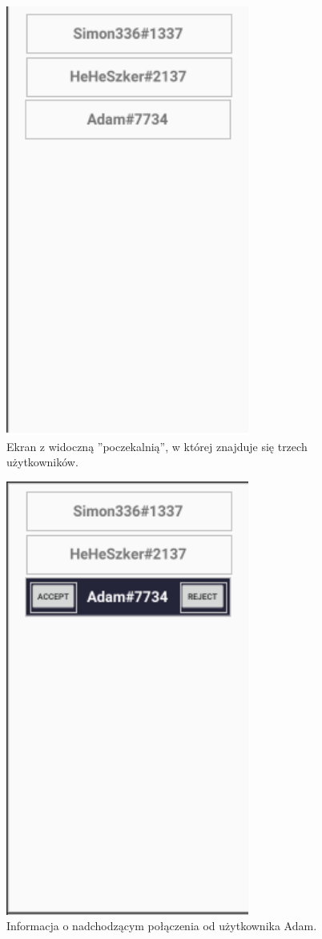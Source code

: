 \begin{figure}[H]
	\centering
	\includegraphics[width=8cm]{images/1.png}
	\caption{\centering Ekran z widoczną ''poczekalnią'', w której znajduje się trzech użytkowników.}
	\hfill 
\end{figure} 
\begin{figure}[H]
	\centering
	\includegraphics[width=8cm]{images/2.png}
	\caption{\centering Informacja o nadchodzącym połączenia od użytkownika Adam.}
	\hfill 
\end{figure} 
